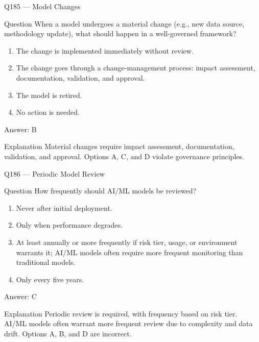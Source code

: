 \documentclass[aspectratio=169,8pt]{beamer}
\begin{document}
\begin{frame}{Q185 --- Model Changes}
\begin{block}{Question}
When a model undergoes a material change (e.g., new data source, methodology update), what should happen in a well-governed framework?
\begin{enumerate}
\item The change is implemented immediately without review.
\item The change goes through a change-management process: impact assessment, documentation, validation, and approval.
\item The model is retired.
\item No action is needed.
\end{enumerate}  \end{block}
\begin{exampleblock}{Answer: B}\end{exampleblock}
\begin{block}{Explanation}
Material changes require impact assessment, documentation, validation, and approval. Options A, C, and D violate governance principles.
\end{block}
\end{frame}

\begin{frame}{Q186 --- Periodic Model Review}
\begin{block}{Question}
How frequently should AI/ML models be reviewed?
\begin{enumerate}
\item Never after initial deployment.
\item Only when performance degrades.
\item At least annually or more frequently if risk tier, usage, or environment warrants it; AI/ML models often require more frequent monitoring than traditional models.
\item Only every five years.
\end{enumerate}  \end{block}
\begin{exampleblock}{Answer: C}\end{exampleblock}
\begin{block}{Explanation}
Periodic review is required, with frequency based on risk tier. AI/ML models often warrant more frequent review due to complexity and data drift. Options A, B, and D are incorrect.
\end{block}
\end{frame}
\end{document}
